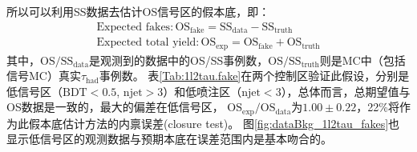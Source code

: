 所以可以利用SS数据去估计OS信号区的假本底，即：
\begin{equation}
 \begin{aligned}
  \text{Expected fakes}: \text{OS}_{\text{fake}}=\text{SS}_{\text{data}}-\text{SS}_{\text{truth}}\\
  \text{Expected total yield}: \text{OS}_{\text{exp}}=\text{OS}_{\text{fake}}+\text{OS}_{\text{truth}}
 \end{aligned}
\end{equation}
其中，$\text{OS}/\text{SS}_{\text{data}}$是观测到的数据中的OS/SS事例数，$\text{OS}/\text{SS}_{\text{truth}}$则是MC中（包括信号MC）真实$\tau_{\text{had}}$事例数。
表\ref{Tab:1l2tau.fake}在两个控制区验证此假设，分别是低信号区（$\text{BDT}<0.5$, $\text{njet}>3$）和低喷注区（$\text{njet}<3$），总体而言，总期望值与OS数据是一致的，最大的偏差在低信号区，
$\text{OS}_{\text{exp}}/\text{OS}_{\text{data}}$为$1.00\pm 0.22$，22\%将作为此假本底估计方法的内禀误差(closure test)。
图\ref{fig:dataBkg_1l2tau_fakes}也显示低信号区的观测数据与预期本底在误差范围内是基本吻合的。
\begin{table}[htbp]
\small
\begin{center}
\caption{假$\tau_{\text{had}}$估计方法在低喷注数区和低信号区的closure test。}
\label{Tab:1l2tau.fake}
\end{center}
\end{table}
